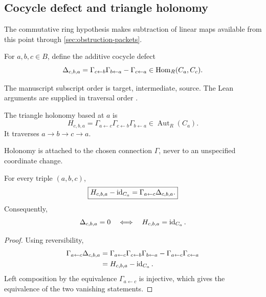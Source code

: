 \subsection{Cocycle defect and triangle holonomy}

The commutative ring hypothesis makes subtraction of linear maps available
from this point through \cref{sec:obstruction-packets}.

\begin{definition}
\label{def:cocycle-defect}
For $a,b,c\in B$, define the additive cocycle defect
\[
\Delta_{c,b,a}
=
\Gamma_{c\leftarrow b}\Gamma_{b\leftarrow a}
-\Gamma_{c\leftarrow a}
\in\operatorname{Hom}_R(C_a,C_c).
\]
\end{definition}

The manuscript subscript order is target, intermediate, source.  The Lean
arguments are supplied in traversal order .

\begin{definition}
\label{def:triangle-holonomy}
The triangle holonomy based at $a$ is
\[
H_{c,b,a}
=
\Gamma_{a\leftarrow c}
\Gamma_{c\leftarrow b}
\Gamma_{b\leftarrow a}
\in\operatorname{Aut}_R(C_a).
\]
It traverses $a\to b\to c\to a$.
\end{definition}

Holonomy is attached to the chosen connection $\Gamma$, never to an
unspecified coordinate change.

\begin{theorem}
\label{thm:defect-holonomy}
For every triple $(a,b,c)$,
\[
\boxed{
H_{c,b,a}-\operatorname{id}_{C_a}
=
\Gamma_{a\leftarrow c}\Delta_{c,b,a}.
}
\]
Consequently,
\[
\Delta_{c,b,a}=0
\quad\Longleftrightarrow\quad
H_{c,b,a}=\operatorname{id}_{C_a}.
\]
\end{theorem}

\begin{proof}
Using reversibility,
\[
\begin{aligned}
\Gamma_{a\leftarrow c}\Delta_{c,b,a}
&=
\Gamma_{a\leftarrow c}
\Gamma_{c\leftarrow b}
\Gamma_{b\leftarrow a}
-
\Gamma_{a\leftarrow c}\Gamma_{c\leftarrow a}\\
&=H_{c,b,a}-\operatorname{id}_{C_a}.
\end{aligned}
\]
Left composition by the equivalence $\Gamma_{a\leftarrow c}$ is injective,
which gives the equivalence of the two vanishing statements.
\end{proof}

